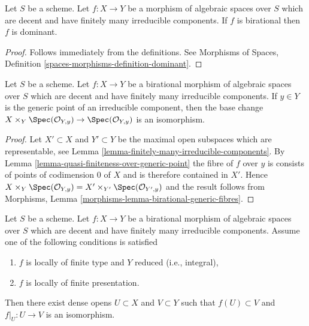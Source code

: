 \begin{lemma}
\label{lemma-birational-dominant}
Let $S$ be a scheme.
Let $f : X \to Y$ be a morphism of algebraic spaces over $S$ which
are decent and have finitely many irreducible components. If $f$ is
birational then $f$ is dominant.
\end{lemma}

\begin{proof}
Follows immediately from the definitions. See
Morphisms of Spaces, Definition \ref{spaces-morphisms-definition-dominant}.
\end{proof}

\begin{lemma}
\label{lemma-birational-generic-fibres}
Let $S$ be a scheme. Let $f : X \to Y$ be a birational morphism of
algebraic spaces over $S$ which are decent and have finitely
many irreducible components. If $y \in Y$ is the generic point of
an irreducible component, then the base change
$X \times_Y \Spec(\mathcal{O}_{Y, y}) \to \Spec(\mathcal{O}_{Y, y})$
is an isomorphism.
\end{lemma}

\begin{proof}
Let $X' \subset X$ and $Y' \subset Y$ be the maximal open subspaces
which are representable, see
Lemma \ref{lemma-finitely-many-irreducible-components}. By
Lemma \ref{lemma-quasi-finiteness-over-generic-point}
the fibre of $f$ over $y$ is consists
of points of codimension $0$ of $X$ and is therefore contained
in $X'$. Hence $X \times_Y \Spec(\mathcal{O}_{Y, y}) =
X' \times_{Y'} \Spec(\mathcal{O}_{Y', y})$ and the result follows
from Morphisms, Lemma \ref{morphisms-lemma-birational-generic-fibres}.
\end{proof}

\begin{lemma}
\label{lemma-birational-birational}
Let $S$ be a scheme. Let $f : X \to Y$ be a birational morphism of
algebraic spaces over $S$ which are decent and have finitely many
irreducible components. Assume one of the following conditions is satisfied
\begin{enumerate}
\item $f$ is locally of finite type and $Y$ reduced (i.e., integral),
\item $f$ is locally of finite presentation.
\end{enumerate}
Then there exist dense opens $U \subset X$ and $V \subset Y$
such that $f(U) \subset V$ and $f|_U : U \to V$ is an isomorphism.
\end{lemma}

